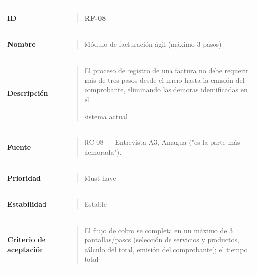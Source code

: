 \documentclass[
]{article}
\newcounter{none} %
\begin{document}
{\def\LTcaptype{none} %
\begin{longtable}[]{@{}
  >{\raggedright\arraybackslash}p{}
  >{\raggedright\arraybackslash}p{}@{}}
\toprule\noalign{}
\begin{minipage}[b]{\linewidth}\raggedright
\textbf{ID}
\end{minipage} & \begin{minipage}[b]{\linewidth}\raggedright
\begin{quote}
RF-08
\end{quote}
\end{minipage} \\
\midrule\noalign{}
\endhead
\bottomrule\noalign{}
\endlastfoot
\textbf{Nombre} & \begin{minipage}[t]{\linewidth}\raggedright
\begin{quote}
Módulo de facturación ágil (máximo 3 pasos)
\end{quote}
\end{minipage} \\
\textbf{Descripción} & \begin{minipage}[t]{\linewidth}\raggedright
\begin{quote}
El proceso de registro de una factura no debe requerir más de tres pasos
desde el inicio hasta la emisión del comprobante, eliminando las demoras
identificadas en el

sistema actual.
\end{quote}
\end{minipage} \\
\textbf{Fuente} & \begin{minipage}[t]{\linewidth}\raggedright
\begin{quote}
RC-08 --- Entrevista A3, Amagua ("es la parte más demorada").
\end{quote}
\end{minipage} \\
\textbf{Prioridad} & \begin{minipage}[t]{\linewidth}\raggedright
\begin{quote}
Must have
\end{quote}
\end{minipage} \\
\textbf{Estabilidad} & \begin{minipage}[t]{\linewidth}\raggedright
\begin{quote}
Estable
\end{quote}
\end{minipage} \\
\textbf{Criterio de aceptación} &
\begin{minipage}[t]{\linewidth}\raggedright
\begin{quote}
El flujo de cobro se completa en un máximo de 3 pantallas/pasos
(selección de servicios y productos, cálculo del total, emisión del
comprobante); el tiempo total


\end{quote}
\end{minipage}
\end{longtable}}
\end{document}
